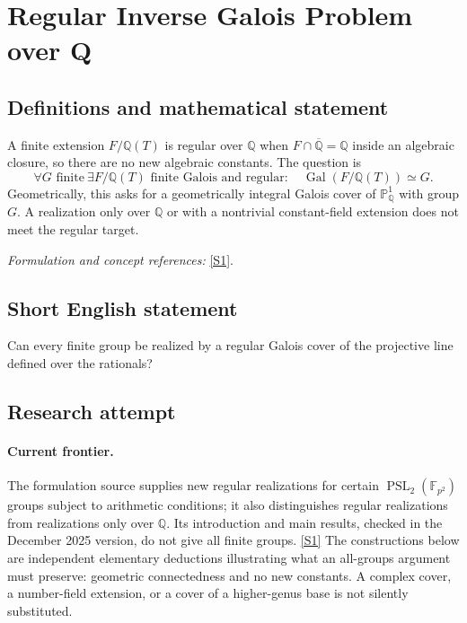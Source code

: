 \documentclass[11pt,a4paper]{article}
\newcommand{\Q}{\mathbb{Q}}
\newcommand{\F}{\mathbb{F}}
\newcommand{\PP}{\mathbb P}
\newcommand{\sref}[2]{\hyperlink{source:#1:#2}{[S#2]}}
\newif\ifshowcatalogue
\newcommand{\cataloguescope}[1]{\ifshowcatalogue
 \paragraph{Exact scope in the supplied catalogue.}
 \begin{quote}\small #1\end{quote}\fi}
\numberwithin{equation}{section}
\begin{document}
\setcounter{section}{119}
\clearpage
\section{\texorpdfstring{Regular Inverse Galois Problem over Q}{Regular Inverse Galois Problem over Q}}\label{120}
\subsection{Definitions and mathematical statement}
A finite extension $F/\Q(T)$ is regular over $\Q$ when $F\cap\overline{\Q}=\Q$ inside an algebraic closure, so there are no new algebraic constants. The question is
\[
 \forall G\text{ finite}\ \exists F/\Q(T)\text{ finite Galois and regular}:\quad
 \operatorname{Gal}(F/\Q(T))\simeq G.
\]
Geometrically, this asks for a geometrically integral Galois cover of $\PP^1_{\Q}$ with group $G$. A realization only over $\Q$ or with a nontrivial constant-field extension does not meet the regular target.
\par\smallskip\textit{Formulation and concept references:} \sref{120}{1}.
\cataloguescope{For every finite group G, does there exist a finite Galois extension F/Q(T) with Gal(F/Q(T)) isomorphic to G and Q algebraically closed in F? Equivalently, require a geometrically integral Galois cover of the projective line over Q with group G. A positive resolution proves this for all finite groups; a negative resolution proves nonexistence for at least one finite group.}
\subsection{Short English statement}
Can every finite group be realized by a regular Galois cover of the projective line defined over the rationals?
\subsection{Research attempt}

\paragraph{Current frontier.}
The formulation source supplies new regular realizations for certain
$\operatorname{PSL}_2(\F_{p^2})$ groups subject to arithmetic conditions;
it also distinguishes regular realizations from realizations only over
$\Q$.  Its introduction and main results, checked in the December 2025
version, do not give all finite groups. \sref{120}{1}
The constructions below are independent elementary deductions illustrating
what an all-groups argument must preserve: geometric connectedness and
no new constants.  A complex cover, a number-field extension, or a cover
of a higher-genus base is not silently substituted.
\end{document}

